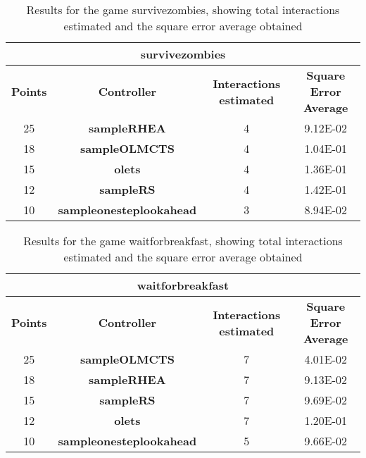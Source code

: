 \begin{table*}[!t]
\begin{center}
\begin{adjustbox}{width=1\textwidth}
\begin{tabular}{|c|c|c|c|}
\hline
\multicolumn{4}{|c|}{\textbf{survivezombies}}\\
\hline
\textbf{Points} & \textbf{Controller} & \textbf{Interactions estimated} & \textbf{Square Error Average}\\
\hline
25 & \textbf{sampleRHEA} & 4 & 9.12E-02
 \\
\hline
18 & \textbf{sampleOLMCTS} & 4 & 1.04E-01
 \\
\hline
15 & \textbf{olets} & 4 & 1.36E-01
 \\
\hline
12 & \textbf{sampleRS} & 4 & 1.42E-01
 \\
\hline
10 & \textbf{sampleonesteplookahead} & 3 & 8.94E-02
 \\
\hline
\end{tabular}
\end{adjustbox}
\caption{Results for the game survivezombies, showing total interactions estimated and the square error average obtained}
\label{tab:weights}
\end{center}
\end{table*}
\begin{table*}[!t]
\begin{center}
\begin{adjustbox}{width=1\textwidth}
\begin{tabular}{|c|c|c|c|}
\hline
\multicolumn{4}{|c|}{\textbf{waitforbreakfast}}\\
\hline
\textbf{Points} & \textbf{Controller} & \textbf{Interactions estimated} & \textbf{Square Error Average}\\
\hline
25 & \textbf{sampleOLMCTS} & 7 & 4.01E-02
 \\
\hline
18 & \textbf{sampleRHEA} & 7 & 9.13E-02
 \\
\hline
15 & \textbf{sampleRS} & 7 & 9.69E-02
 \\
\hline
12 & \textbf{olets} & 7 & 1.20E-01
 \\
\hline
10 & \textbf{sampleonesteplookahead} & 5 & 9.66E-02
 \\
\hline
\end{tabular}
\end{adjustbox}
\caption{Results for the game waitforbreakfast, showing total interactions estimated and the square error average obtained}
\label{tab:weights}
\end{center}
\end{table*}
